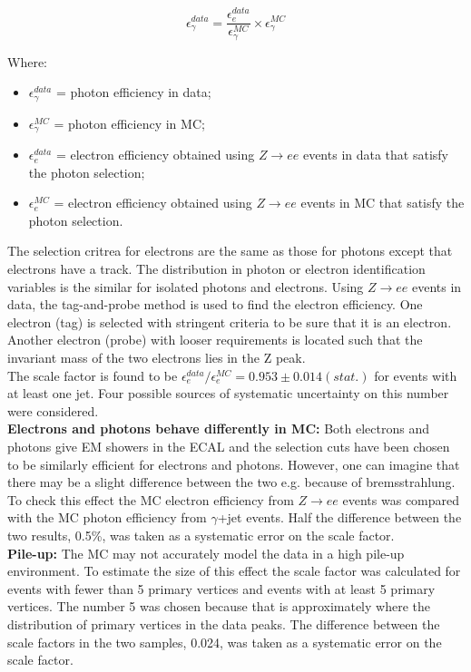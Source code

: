 \begin{equation}
\epsilon_{\gamma}^{data} = \frac{\epsilon_{e}^{data}}{\epsilon_{\gamma}^{MC}}
\times \epsilon_{\gamma}^{MC}
\label{eq:Scale_Factor}
\end{equation}  

Where:
\begin{itemize}
\item $\epsilon_{\gamma}^{data}$ = photon efficiency in data;
\item $\epsilon_{\gamma}^{MC}$ = photon efficiency in MC;
\item $\epsilon_{e}^{data}$ = electron efficiency obtained using $Z\rightarrow
ee$ events in data that satisfy the photon selection; 
\item $\epsilon_{e}^{MC}$ = electron efficiency obtained using $Z\rightarrow ee$
events in MC that satisfy the photon selection. 
\end{itemize}

The selection critrea for electrons are the same as those for photons except 
that electrons have a track. The distribution in photon or electron 
identification variables is the similar for isolated photons and electrons. 
Using $Z\rightarrow ee$ events in data, the tag-and-probe method is used to find
the electron efficiency. One electron (tag) is selected with stringent criteria 
to be sure that it is an electron. Another electron (probe) with looser 
requirements is located such that the invariant mass of the two electrons lies 
in the Z peak. \\

The scale factor is found to be $\epsilon_{e}^{data}/\epsilon_{e}^{MC} =
0.953\pm 0.014(stat.)$ for events with at least one jet. Four possible sources
of systematic uncertainty on this number were considered. \\

{\bf Electrons and photons behave differently in MC:} Both electrons and photons
give EM showers in the ECAL and the selection cuts have been chosen to be
similarly efficient for electrons and photons. However, one can imagine that
there may be a slight difference between the two e.g. because of bremsstrahlung.
To check this effect the MC electron efficiency from $Z\rightarrow ee$ events
was compared with the MC photon efficiency from $\gamma$+jet events. Half the
difference between the two results, 0.5\%, was taken as a systematic error on
the scale factor. \\

{\bf Pile-up:} The MC may not accurately model the data in a high pile-up
environment. To estimate the size of this effect the scale factor was calculated
for events with fewer than 5 primary vertices and events with at least 5 primary
vertices. The number 5 was chosen because that is approximately where the 
distribution of primary vertices in the data peaks. The difference between the
scale factors in the two samples, 0.024, was taken as a systematic error on the 
scale factor. \\

